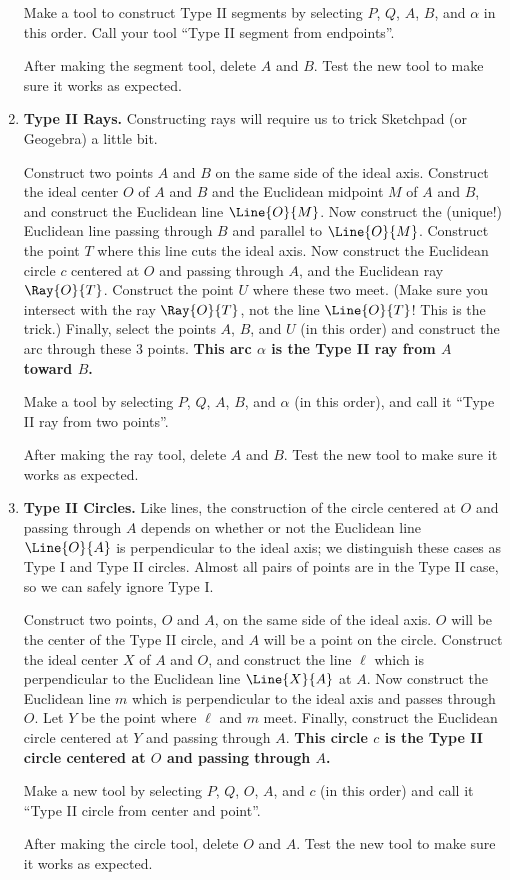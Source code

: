 \documentclass{article}
\begin{document}
\begin{enumerate}
Make a tool to construct Type II segments by selecting $P$, $Q$, $A$, $B$, and $\alpha$ in this order. Call your tool ``Type II segment from endpoints''.

After making the segment tool, delete $A$ and $B$. Test the new tool to make sure it works as expected.



\item \textbf{Type II Rays.} Constructing rays will require us to trick Sketchpad (or Geogebra) a little bit.

Construct two points $A$ and $B$ on the same side of the ideal axis. Construct the ideal center $O$ of $A$ and $B$ and the Euclidean midpoint $M$ of $A$ and $B$, and construct the Euclidean line $\Line{O}{M}$. Now construct the (unique!) Euclidean line passing through $B$ and parallel to $\Line{O}{M}$. Construct the point $T$ where this line cuts the ideal axis. Now construct the Euclidean circle $c$ centered at $O$ and passing through $A$, and the Euclidean ray $\Ray{O}{T}$. Construct the point $U$ where these two meet. (Make sure you intersect with the ray $\Ray{O}{T}$, not the line $\Line{O}{T}$! This is the trick.) Finally, select the points $A$, $B$, and $U$ (in this order) and construct the arc through these 3 points. \textbf{This arc $\alpha$ is the Type II ray from $A$ toward $B$.}

Make a tool by selecting $P$, $Q$, $A$, $B$, and $\alpha$ (in this order), and call it ``Type II ray from two points''.

After making the ray tool, delete $A$ and $B$. Test the new tool to make sure it works as expected.



\item \textbf{Type II Circles.} Like lines, the construction of the circle centered at $O$ and passing through $A$ depends on whether or not the Euclidean line $\Line{O}{A}$ is perpendicular to the ideal axis; we distinguish these cases as Type I and Type II circles. Almost all pairs of points are in the Type II case, so we can safely ignore Type I.

Construct two points, $O$ and $A$, on the same side of the ideal axis. $O$ will be the center of the Type II circle, and $A$ will be a point on the circle. Construct the ideal center $X$ of $A$ and $O$, and construct the line $\ell$ which is perpendicular to the Euclidean line $\Line{X}{A}$ at $A$. Now construct the Euclidean line $m$ which is perpendicular to the ideal axis and passes through $O$. Let $Y$ be the point where $\ell$ and $m$ meet. Finally, construct the Euclidean circle centered at $Y$ and passing through $A$. \textbf{This circle $c$ is the Type II circle centered at $O$ and passing through $A$.}

Make a new tool by selecting $P$, $Q$, $O$, $A$, and $c$ (in this order) and call it ``Type II circle from center and point''.

After making the circle tool, delete $O$ and $A$. Test the new tool to make sure it works as expected.
\end{enumerate}
\end{document}
